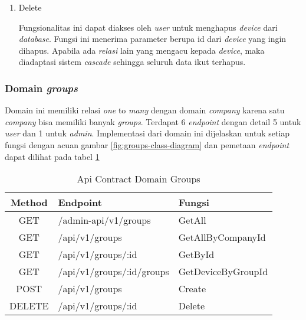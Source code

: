 \begin{enumerate}
  \item Delete

        Fungsionalitas ini dapat diakses oleh \textit{user} untuk menghapus \textit{device} dari \textit{database}. Fungsi ini menerima parameter berupa id dari \textit{device} yang ingin dihapus. Apabila ada \textit{relasi} lain yang mengacu kepada \textit{device}, maka diadaptasi sistem \textit{cascade} sehingga seluruh data ikut terhapus.

\end{enumerate}

\subsubsection{Domain \textit{groups}}

Domain ini memiliki relasi \textit{one} to \textit{many} dengan domain \textit{company} karena satu \textit{company} bisa memiliki banyak \textit{groups}. Terdapat 6 \textit{endpoint} dengan detail 5 untuk \textit{user} dan 1 untuk \textit{admin}. Implementasi dari domain ini dijelaskan untuk setiap fungsi dengan acuan gambar \ref{fig:groups-class-diagram} dan pemetaan \textit{endpoint} dapat dilihat pada tabel \ref{tab:api-contract-domain-groups}

\bgroup
\begin{table}[ht]
  \caption{Api Contract Domain Groups}
  \label{tab:api-contract-domain-groups}
  \def\arraystretch{1.7}
  \centering
  \begin{tabular}{|c|p{6cm}|p{4cm}|}
    \hline
    Method & Endpoint                  &
    Fungsi                                                  \\
    \hline
    GET    & /admin-api/v1/groups      & GetAll             \\
    \hline
    GET    & /api/v1/groups            & GetAllByCompanyId  \\
    \hline
    GET    & /api/v1/groups/:id        & GetById            \\
    \hline
    GET    & /api/v1/groups/:id/groups & GetDeviceByGroupId \\
    \hline
    POST   & /api/v1/groups            & Create             \\
    \hline
    DELETE & /api/v1/groups/:id        & Delete             \\
    \hline
  \end{tabular}
\end{table}
\egroup

\pagebreak

